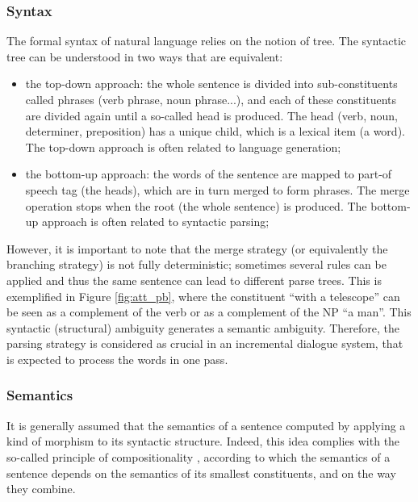 \documentclass[11pt]{article}
\begin{document}
			\subsubsection{Syntax}
				The formal syntax of natural language relies on the notion of tree. The syntactic tree can be understood in two ways that are equivalent:
				\begin{itemize}
					\item the top-down approach: the whole sentence is divided into sub-constituents called phrases (verb phrase, noun phrase...), and each of these constituents are divided again until a so-called head is produced. The head (verb, noun, determiner, preposition) has a unique child, which is a lexical item (a word). The top-down approach is often related to language generation;
					\item the bottom-up approach: the words of the sentence are mapped to part-of speech tag (the heads), which are in turn merged to form phrases. The merge operation stops when the root (the whole sentence) is produced. The bottom-up approach is often related to syntactic parsing;
				\end{itemize}
				However, it is important to note that the merge strategy (or equivalently the branching strategy) is not fully deterministic; sometimes several rules can be applied and thus the same sentence can lead to different parse trees. This is exemplified in Figure \ref{fig:att_pb}, where the constituent ``with a telescope'' can be seen as a complement of the verb or as a complement of the NP ``a man''. This syntactic (structural) ambiguity generates a semantic ambiguity. Therefore, the parsing strategy is considered as crucial in an incremental dialogue system, that is expected to process the words in one pass.
				
				
	
			\subsubsection{Semantics}
				It is generally assumed that the semantics of a sentence computed by applying a kind of morphism to its syntactic structure. Indeed, this idea complies with the so-called principle of compositionality \cite{frege1997}, according to which the semantics of a sentence depends on the semantics of its smallest constituents, and on the way they combine.\\
				
\end{document}

